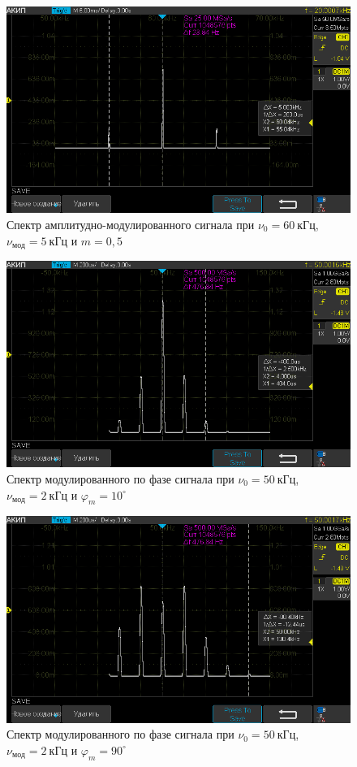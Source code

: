 \documentclass[a4paper, 12pt]{article}
\begin{document}
\begin{figure}[h!]
\begin{flushleft}
    \includegraphics[scale=0.5]{AKIP0017.png}
\end{flushleft}
\caption{Спектр амплитудно-модулированного сигнала при $\nu_0 = 60~кГц$, $\nu_{мод} = 5~кГц$ и $m = 0,5$}
\label{ris23}
\end{figure}

\begin{figure}[h!]
\begin{flushleft}
    \includegraphics[scale=0.5]{AKIP0018.png}
\end{flushleft}
\caption{Спектр модулированного по фазе сигнала при $\nu_0 = 50~кГц$, $\nu_{мод} = 2~кГц$ и $\varphi_m = 10^{\circ}$}
\label{ris24}
\end{figure}

\begin{figure}[h!]
\begin{flushleft}
    \includegraphics[scale=0.5]{AKIP0019.png}
\end{flushleft}
\caption{Спектр модулированного по фазе сигнала при $\nu_0 = 50~кГц$, $\nu_{мод} = 2~кГц$ и $\varphi_m = 90^{\circ}$}
\label{ris25}
\end{figure}
\end{document}

